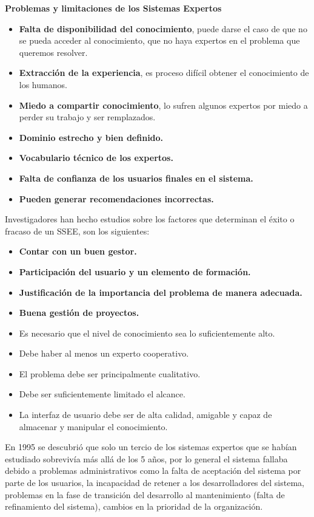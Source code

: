 \documentclass[12pt, twoside, openright]{report} %
\begin{document}
\textbf{Problemas y limitaciones de los Sistemas Expertos}
\begin{itemize}
	\item \textbf{Falta de disponibilidad del conocimiento}, puede darse el caso de que no se pueda acceder al conocimiento, que no haya expertos en el problema que queremos resolver.
	\item \textbf{Extracción de la experiencia}, es proceso difícil obtener el conocimiento de los humanos.
	\item \textbf{Miedo a compartir conocimiento}, lo sufren algunos expertos por miedo a perder su trabajo y ser remplazados.
	\item \textbf{Dominio estrecho y bien definido.}
	\item \textbf{Vocabulario técnico de los expertos.}
	\item \textbf{Falta de confianza de los usuarios finales en el sistema.}
	\item \textbf{Pueden generar recomendaciones incorrectas.}
\end{itemize}

Investigadores han hecho estudios sobre los factores que determinan el éxito o fracaso de un SSEE, son los siguientes:
\begin{itemize}
	\item \textbf{Contar con un buen gestor.}
	\item \textbf{Participación del usuario y un elemento de formación.}
	\item \textbf{Justificación de la importancia del problema de manera adecuada.}
	\item \textbf{Buena gestión de proyectos.}
	\item Es necesario que el nivel de conocimiento sea lo suficientemente alto.
	\item Debe haber al menos un experto cooperativo.
	\item El problema debe ser principalmente cualitativo.
	\item Debe ser suficientemente limitado el alcance.
	\item La interfaz de usuario debe ser de alta calidad, amigable y capaz de almacenar y manipular el conocimiento.
\end{itemize}

En 1995 se descubrió que solo un tercio de los sistemas expertos que se habían estudiado sobrevivía más allá de los 5 años, por lo general el sistema fallaba debido a problemas administrativos como la falta de aceptación del sistema por parte de los usuarios, la incapacidad de retener a los desarrolladores del sistema, problemas en la fase de transición del desarrollo al mantenimiento (falta de refinamiento del sistema), cambios en la prioridad de la organización. 
\end{document}
